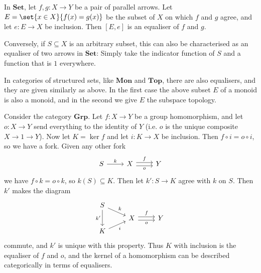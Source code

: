 \documentclass[article, a4paper, 11pt, oneside]{memoir}
\numberwithin{equation}{chapter}
\newcommand{\ncat}[1]{\mathbf{#1}} %
\newcommand{\catSet}{\ncat{Set}}
\newcommand{\catTop}{\ncat{Top}}
\newcommand{\catGrp}{\ncat{Grp}}
\newcommand{\catMon}{\ncat{Mon}}
\begin{document}
\begin{examplebreak}
    \begin{enumexample}
        \item In $\catSet$, let $f,g \colon X \to Y$ be a pair of parallel arrows. Let $E = \set{ x \in X }{ f(x) = g(x) }$ be the subset of $X$ on which $f$ and $g$ agree, and let $e \colon E \to X$ be inclusion. Then $[E,e]$ is an equaliser of $f$ and $g$.
        
        Conversely, if $S \subseteq X$ is an arbitrary subset, this can also be characterised as an equaliser of two arrows in $\catSet$: Simply take the indicator function of $S$ and a function that is $1$ everywhere.

        \item In categories of structured sets, like $\catMon$ and $\catTop$, there are also equalisers, and they are given similarly as above. In the first case the above subset $E$ of a monoid is also a monoid, and in the second we give $E$ the subspace topology.
        
        \item Consider the category $\catGrp$. Let $f \colon X \to Y$ be a group homomorphism, and let $o \colon X \to Y$ send everything to the identity of $Y$ (i.e. $o$ is the unique composite $X \to 1 \to Y$). Now let $K = \ker f$ and let $i \colon K \to X$ be inclusion. Then $f \circ i = o \circ i$, so we have a fork. Given any other fork
        \begin{equation*}
            \begin{tikzcd}
                S
                    \ar[r, "k"]
                & X
                    \ar[r, "f", shift left]
                    \ar[r, "o", shift right, swap]
                & Y
            \end{tikzcd}
        \end{equation*}
        we have $f \circ k = o \circ k$, so $k(S) \subseteq K$. Then let $k' \colon S \to K$ agree with $k$ on $S$. Then $k'$ makes the diagram
        \begin{equation*}
            \begin{tikzcd}[row sep=tiny]
                S
                    \ar[dr, "k"]
                    \ar[dd, "k'", swap]
                \\
                & X
                    \ar[r, "f", shift left]
                    \ar[r, "o", shift right, swap]
                & Y
                \\
                K
                    \ar[ur, "i", swap]
            \end{tikzcd}
        \end{equation*}
        commute, and $k'$ is unique with this property. Thus $K$ with inclusion is the equaliser of $f$ and $o$, and the kernel of a homomorphism can be described categorically in terms of equalisers.


\end{enumexample}
\end{examplebreak}
\end{document}
